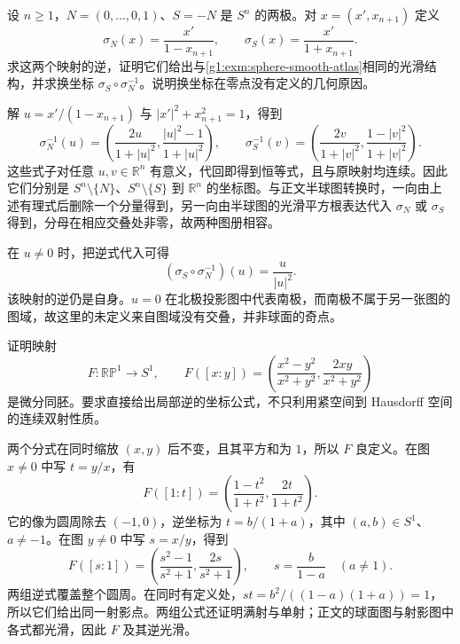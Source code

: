 \BookExercises


\begin{exercise}
	\label{g1:ex:stereographic-smooth-charts}
	设 \(n\geq1\)，\(N=(0,\ldots,0,1)\)、\(S=-N\) 是 \(S^n\) 的两极。对 \(x=(x',x_{n+1})\) 定义
	\[
		\sigma_N(x)=\frac{x'}{1-x_{n+1}},\qquad
		\sigma_S(x)=\frac{x'}{1+x_{n+1}}.
	\]
	求这两个映射的逆，证明它们给出与\cref{g1:exm:sphere-smooth-atlas}相同的光滑结构，并求换坐标 \(\sigma_S\circ\sigma_N^{-1}\)。说明换坐标在零点没有定义的几何原因。
\end{exercise}

\begin{solution}
	解 \(u=x'/(1-x_{n+1})\) 与 \(|x'|^2+x_{n+1}^2=1\)，得到
	\[
		\sigma_N^{-1}(u)=\left(\frac{2u}{1+|u|^2},\frac{|u|^2-1}{1+|u|^2}\right),\qquad
		\sigma_S^{-1}(v)=\left(\frac{2v}{1+|v|^2},\frac{1-|v|^2}{1+|v|^2}\right).
	\]
	这些式子对任意 \(u,v\in\mathbb R^n\) 有意义，代回即得到恒等式，且与原映射均连续。因此它们分别是 \(S^n\setminus\{N\}\)、\(S^n\setminus\{S\}\) 到 \(\mathbb R^n\) 的坐标图。与正文半球图转换时，一向由上述有理式后删除一个分量得到，另一向由半球图的光滑平方根表达代入 \(\sigma_N\) 或 \(\sigma_S\) 得到，分母在相应交叠处非零，故两种图册相容。

	在 \(u\neq0\) 时，把逆式代入可得
	\[
		(\sigma_S\circ\sigma_N^{-1})(u)=\frac{u}{|u|^2}.
	\]
	该映射的逆仍是自身。\(u=0\) 在北极投影图中代表南极，而南极不属于另一张图的图域，故这里的未定义来自图域没有交叠，并非球面的奇点。
\end{solution}

\begin{exercise}
	\label{g1:ex:projective-line-circle}
	证明映射
	\[
		F:\mathbb{RP}^1\longrightarrow S^1,\qquad
		F([x:y])=\left(\frac{x^2-y^2}{x^2+y^2},\frac{2xy}{x^2+y^2}\right)
	\]
	是微分同胚。要求直接给出局部逆的坐标公式，不只利用紧空间到 Hausdorff 空间的连续双射性质。
\end{exercise}

\begin{solution}
	两个分式在同时缩放 \((x,y)\) 后不变，且其平方和为 \(1\)，所以 \(F\) 良定义。在图 \(x\neq0\) 中写 \(t=y/x\)，有
	\[
		F([1:t])=\left(\frac{1-t^2}{1+t^2},\frac{2t}{1+t^2}\right).
	\]
	它的像为圆周除去 \((-1,0)\)，逆坐标为 \(t=b/(1+a)\)，其中 \((a,b)\in S^1\)、\(a\neq-1\)。在图 \(y\neq0\) 中写 \(s=x/y\)，得到
	\[
		F([s:1])=\left(\frac{s^2-1}{s^2+1},\frac{2s}{s^2+1}\right),\qquad s=\frac{b}{1-a}\quad(a\neq1).
	\]
	两组逆式覆盖整个圆周。在同时有定义处，\(st=b^2/((1-a)(1+a))=1\)，所以它们给出同一射影点。两组公式还证明满射与单射；正文的球面图与射影图中各式都光滑，因此 \(F\) 及其逆光滑。
\end{solution}

